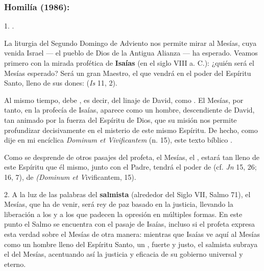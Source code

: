 			\subsubsection{Homilía (1986):}
			
				
				\begin{body} 
					1. . 
					
					La liturgia del Segundo Domingo de Adviento nos permite mirar al Mesías, cuya venida Israel --- el pueblo de Dios de la Antigua Alianza --- ha esperado. Veamos primero con la mirada profética de \textbf{Isaías} (en el siglo VIII a. C.): ¿quién será el Mesías esperado? Será un gran Maestro, el que vendrá en el poder del Espíritu Santo, lleno de sus dones:  (\emph{Is} 11, 2). 
					
					Al mismo tiempo, debe , es decir, del linaje de David, como . El Mesías, por tanto, en la profecía de Isaías, aparece como un hombre, descendiente de David, tan animado por la fuerza del Espíritu de Dios, que su misión nos permite profundizar decisivamente en el misterio de este mismo Espíritu. De hecho, como dije en mi encíclica \emph{Dominum et Vivificantem} (n. 15), este texto bíblico . 
					
					Como se desprende de otros pasajes del profeta, el Mesías, el , estará tan lleno de este Espíritu que él mismo, junto con el Padre, tendrá el poder de  (cf. \emph{Jn} 15, 26; 16, 7), de  \emph{(Dominum et V}ivificantem, 15). 
					
					2. A la luz de las palabras del \textbf{salmista} (alrededor del Siglo VII, Salmo 71), el Mesías, que ha de venir, será rey de paz basado en la justicia, llevando la liberación a los  y a los que padecen la opresión en múltiples formas. En este punto el Salmo se encuentra con el pasaje de Isaías, incluso si el profeta expresa esta verdad sobre el Mesías de otra manera: mientras que Isaías ve aquí al Mesías como un hombre lleno del Espíritu Santo, un , fuerte y justo, el salmista subraya el  del Mesías, acentuando así la justicia y eficacia de su gobierno universal y eterno. 
					

\end{body}

